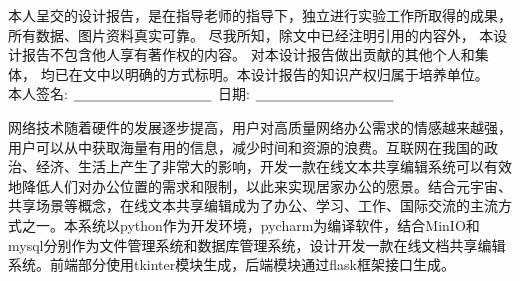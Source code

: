 

\thispagestyle{empty}
\vspace*{20pt}
\begin{center}
	{}
\end{center}
\par\vspace*{30pt}
\renewcommand{\baselinestretch}{2}
{%
	
本人呈交的设计报告，是在指导老师的指导下，独立进行实验工作所取得的成果，
所有数据、图片资料真实可靠。 尽我所知，除文中已经注明引用的内容外，
本设计报告不包含他人享有著作权的内容。
对本设计报告做出贡献的其他个人和集体，
均已在文中以明确的方式标明。本设计报告的知识产权归属于培养单位。\\[2cm]
	
	\hspace*{1cm}本人签名: $\underline{\hspace{3.5cm}}$
	\hspace{2cm}日期: $\underline{\hspace{3.5cm}}$\hfill\par}

\renewcommand{\baselinestretch}{1.5}  %

\begin{cnabstract}
网络技术随着硬件的发展逐步提高，用户对高质量网络办公需求的情感越来越强，用户可以从中获取海量有用的信息，减少时间和资源的浪费。互联网在我国的政治、经济、生活上产生了非常大的影响，开发一款在线文本共享编辑系统可以有效地降低人们对办公位置的需求和限制，以此来实现居家办公的愿景。结合元宇宙、共享场景等概念，在线文本共享编辑成为了办公、学习、工作、国际交流的主流方式之一。本系统以python作为开发环境，pycharm为编译软件，结合MinIO和mysql分别作为文件管理系统和数据库管理系统，设计开发一款在线文档共享编辑系统。前端部分使用tkinter模块生成，后端模块通过flask框架接口生成。


\end{cnabstract}
\par
\vspace*{2em}


